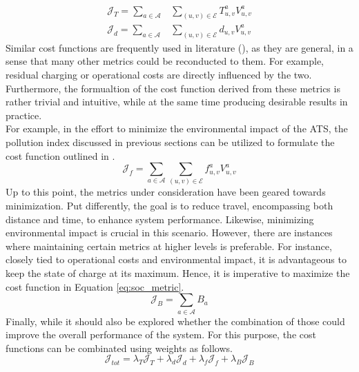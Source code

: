 \begin{align}
	\mathcal{J}_T = \sum_{a \in \mathcal{A}} &\sum_{(u, v) \in \mathcal{E}} T^a_{ u,v} V^a_{u,v} \label{eq:travel_time_routing}\\
	\mathcal{J}_d = \sum_{a \in \mathcal{A}} &\sum_{(u, v) \in \mathcal{E}} d_{ u,v} V^a_{u,v}\label{eq:distance_time_routing}
\end{align} 
Similar cost functions are frequently used in literature (\cite{7579135}), as they are general, in a sense that many other metrics could be reconducted to them. For example, residual charging or operational costs are directly influenced by the two. Furthermore, the formualtion of the cost function derived from these metrics is rather trivial and intuitive, while at the same time producing desirable results in practice. \\
For example, in the effort to minimize the environmental impact of the ATS, the pollution index discussed in previous sections can be utilized to formulate the cost function outlined in .
\begin{equation}
	\mathcal{J}_f =\sum_{a \in \mathcal{A}} \sum_{(u, v) \in \mathcal{E}} f^a_{ u,v} V^a_{u,v} 
	\label{eq:pollution_metric}
\end{equation} 
Up to this point, the metrics under consideration have been geared towards minimization. Put differently, the goal is to reduce travel, encompassing both distance and time, to enhance system performance. Likewise, minimizing environmental impact is crucial in this scenario. However, there are instances where maintaining certain metrics at higher levels is preferable. For instance, closely tied to operational costs and environmental impact, it is advantageous to keep the state of charge at its maximum. Hence, it is imperative to maximize the cost function in Equation \ref{eq:soc_metric}.
\begin{equation}
	\mathcal{J}_B =\sum_{a \in \mathcal{A}}  B_a 
	\label{eq:soc_metric}
\end{equation} 
Finally, while it should also be explored whether the combination of those could improve the overall performance of the system. For this purpose, the cost functions can be combinated using weights as follows.  
\begin{equation}
	\mathcal{J}_{tot} = \lambda_T\mathcal{J}_T +\lambda_d\mathcal{J}_d +\lambda_f\mathcal{J}_f +\lambda_B\mathcal{J}_B 
	\label{eq:combined_metrics}
\end{equation} \\
